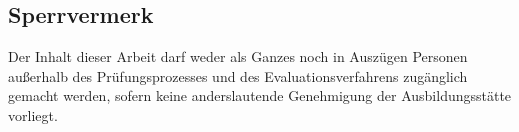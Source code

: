 \begin{centering}
\section*{Sperrvermerk}
\end{centering}
Der Inhalt dieser Arbeit darf weder als Ganzes noch in Auszügen Personen
außerhalb des Prüfungsprozesses und des Evaluationsverfahrens zugänglich
gemacht werden, sofern keine anderslautende Genehmigung der Ausbildungsstätte
vorliegt.
\clearpage

